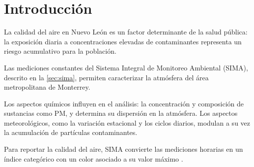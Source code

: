 \section{Introducción}
\label{sec:introduccion}

La calidad del aire en Nuevo León es un factor determinante de la salud
pública: la exposición diaria a concentraciones elevadas de contaminantes
representa un riesgo acumulativo para la población.

Las mediciones constantes del Sistema Integral de Monitoreo Ambiental (SIMA),
descrito en la \cref{sec:sima}, permiten caracterizar la atmósfera del área
metropolitana de Monterrey.

Los aspectos químicos influyen en el análisis: la concentración y composición
de sustancias como PM,  y  determina su dispersión en la
atmósfera. Los aspectos meteorológicos, como la variación estacional y los
ciclos diarios, modulan a su vez la acumulación de partículas contaminantes.

Para reportar la calidad del aire, SIMA convierte las mediciones horarias en
un índice categórico con un color asociado a su valor máximo
\parencite{aireNL2026}.
